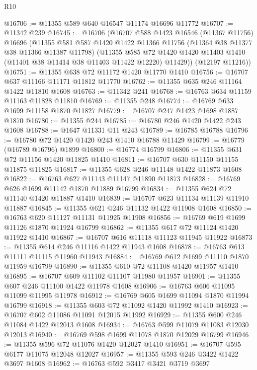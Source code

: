 \begin{lexlean}{R10}
\begin{coremodule}
@16706 := @11355 @589 @640 @16547 @11174 @16696 @11772
@16707 := @11342 @239
@16745 := @16706
    (@16707
      @588
      @1423
      @16546
      (@11367 @11756)
      @16696
      (@11355
        @581
        @587
        @1420
        @1422
        @11366
        @11756
        (@11364 @38 @11377 @38 @11366 @11387 @11798)
        (@11355
          @585
          @72
          @1420
          @1420
          @11403
          @1410
          (@11401 @38 @11414 @38 @11403 @11422 @12220)
          @11429))
      (@12197 @11216))
@16751 := @11355 @638 @72 @11172 @1420 @11770 @1410
@16756 := @16707 @637 @11166 @11171 @11812 @11770
@16762 := @11355 @635 @246 @11164 @1422 @11810 @1608
@16763 := @11342 @241
@16768 := @16763 @634 @11159 @11163 @11828 @11810
@16769 := @11355 @248
@16774 := @16769 @633 @1699 @11158 @1870 @11827
@16779 := @16707 @247 @1423 @1698 @1887 @1870
@16780 := @11355 @244
@16785 := @16780 @246 @1420 @1422 @243 @1608
@16788 := @1647 @11331 @11 @243
@16789 := @16785 @16788
@16796 := @16780 @72 @1420 @1420 @243 @1410 @16788 @11429
@16799 := @16779 (@16789 @16796) @1899
@16800 := @16774 @16799
@16806 := @11355 @631 @72 @11156 @1420 @11825 @1410
@16811 := @16707 @630 @11150 @11155 @11875 @11825
@16817 := @11355 @628 @246 @11148 @1422 @11873 @1608
@16822 := @16763 @627 @11143 @11147 @11890 @11873
@16828 := @16769 @626 @1699 @11142 @1870 @11889 @16799
@16834 := @11355 @624 @72 @11140 @1420 @11887 @1410
@16839 := @16707 @623 @11134 @11139 @11910 @11887
@16845 := @11355 @621 @246 @11132 @1422 @11908 @1608
@16850 := @16763 @620 @11127 @11131 @11925 @11908
@16856 := @16769 @619 @1699 @11126 @1870 @11924 @16799
@16862 := @11355 @617 @72 @11124 @1420 @11922 @1410
@16867 := @16707 @616 @11118 @11123 @11945 @11922
@16873 := @11355 @614 @246 @11116 @1422 @11943 @1608
@16878 := @16763 @613 @11111 @11115 @11960 @11943
@16884 := @16769 @612 @1699 @11110 @1870 @11959 @16799
@16890 := @11355 @610 @72 @11108 @1420 @11957 @1410
@16895 := @16707 @609 @11102 @11107 @11980 @11957
@16901 := @11355 @607 @246 @11100 @1422 @11978 @1608
@16906 := @16763 @606 @11095 @11099 @11995 @11978
@16912 := @16769 @605 @1699 @11094 @1870 @11994 @16799
@16918 := @11355 @603 @72 @11092 @1420 @11992 @1410
@16923 := @16707 @602 @11086 @11091 @12015 @11992
@16929 := @11355 @600 @246 @11084 @1422 @12013 @1608
@16934 := @16763 @599 @11079 @11083 @12030 @12013
@16940 := @16769 @598 @1699 @11078 @1870 @12029 @16799
@16946 := @11355 @596 @72 @11076 @1420 @12027 @1410
@16951 := @16707 @595 @6177 @11075 @12048 @12027
@16957 := @11355 @593 @246 @3422 @1422 @3697 @1608
@16962 := @16763 @592 @3417 @3421 @3719 @3697

\end{coremodule}
\end{lexlean}
